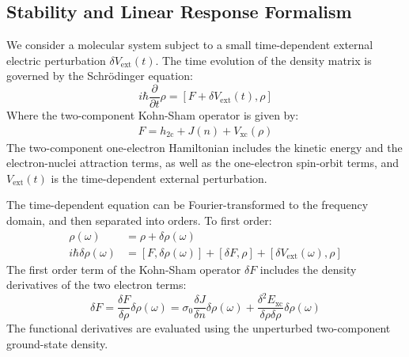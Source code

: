 \documentclass[12pt]{article}
\begin{document}
\subsection{Stability and Linear Response Formalism}
We consider a molecular system subject to a small time-dependent external electric perturbation $\delta V_\mathrm{ext}(t)$.
The time evolution of the density matrix is governed by the Schr{\"{o}}dinger equation:
\begin{equation}
\label{eq:PEvol}
 i\hbar\frac{\partial}{\partial t}\rho= [F+\delta V_\mathrm{ext}(t),\rho]
\end{equation}
Where the two-component Kohn-Sham operator is given by:
\begin{align}
 F = h_\mathrm{2c} + J(n) + V_\mathrm{xc}(\rho)
\end{align}
The two-component one-electron Hamiltonian includes the kinetic energy and the electron-nuclei attraction terms, as well as the one-electron spin-orbit terms, and $V_\mathrm{ext}(t)$ is the time-dependent external perturbation.

The time-dependent equation can be Fourier-transformed to the frequency domain, and then separated into orders.
To first order:
\begin{align}
 \rho(\omega) &= \rho + \delta\rho(\omega) \\ 
 i\hbar\delta\rho(\omega) &= [F,\delta\rho(\omega)] + [\delta F, \rho] + [\delta V_\mathrm{ext}(\omega), \rho]
\end{align}
The first order term of the Kohn-Sham operator $\delta F$ includes the density derivatives of the two electron terms:
\begin{equation}
 \delta F = \frac{\delta F}{\delta\rho}\delta\rho(\omega) =
  \sigma_0\frac{\delta J}{\delta n}\delta\rho(\omega) + \frac{\delta^2 E_\mathrm{xc}}{\delta\rho\delta\rho} \delta\rho(\omega)
\end{equation}
The functional derivatives are evaluated using the unperturbed two-component ground-state density.
\end{document}
